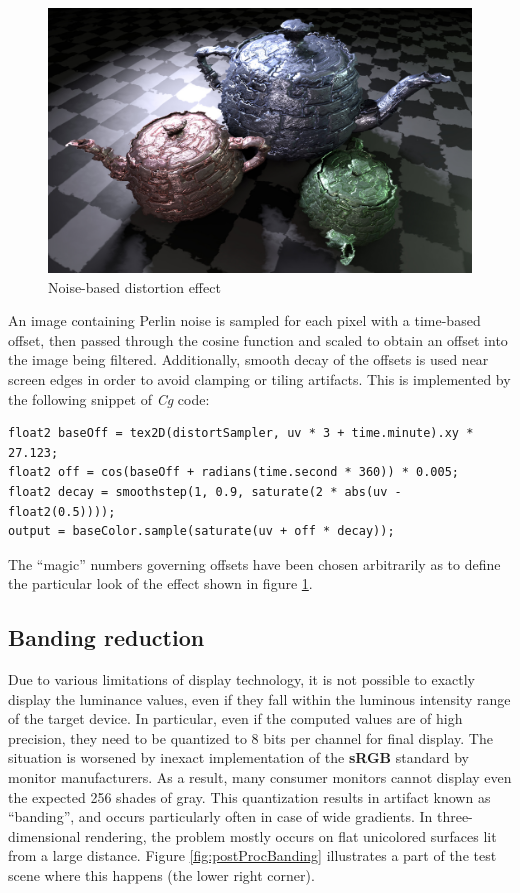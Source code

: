 \begin{figure}[h!]
  \centering
    \includegraphics[width=0.9\linewidth]{./Figures/postProc/distortion.jpg}
    \caption[Distortion]{Noise-based distortion effect}
  \label{fig:postProcDistortion}
\end{figure}

An image containing Perlin noise is sampled for each pixel with a time-based offset, then passed through the cosine function and scaled to obtain an offset into the image being filtered. Additionally, smooth decay of the offsets is used near screen edges in order to avoid clamping or tiling artifacts. This is implemented by the following snippet of \emph{Cg} code:

\begin{lstlisting}[frame=single]
float2 baseOff = tex2D(distortSampler, uv * 3 + time.minute).xy * 27.123;
float2 off = cos(baseOff + radians(time.second * 360)) * 0.005;
float2 decay = smoothstep(1, 0.9, saturate(2 * abs(uv - float2(0.5))));
output = baseColor.sample(saturate(uv + off * decay));
\end{lstlisting}

The ``magic'' numbers governing offsets have been chosen arbitrarily as to define the particular look of the effect shown in figure \ref{fig:postProcDistortion}.

\subsection{Banding reduction}

Due to various limitations of display technology, it is not possible to exactly display the luminance values, even if they fall within the luminous intensity range of the target device. In particular, even if the computed values are of high precision, they need to be quantized to 8 bits per channel for final display. The situation is worsened by inexact implementation of the \textbf{sRGB} standard by monitor manufacturers. As a result, many consumer monitors cannot display even the expected 256 shades of gray. This quantization results in artifact known as ``banding'', and occurs particularly often in case of wide gradients. In three-dimensional rendering, the problem mostly occurs on flat unicolored surfaces lit from a large distance. Figure \ref{fig:postProcBanding} illustrates a part of the test scene where this happens (the lower right corner).

